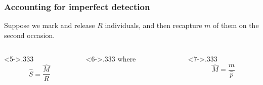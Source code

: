 \documentclass[color=usenames,dvipsnames]{beamer}\usepackage[]{graphicx}\usepackage[]{xcolor}
\begin{document}
\begin{frame}
  \frametitle{Accounting for imperfect detection}
  Suppose we mark and release $R$ individuals, and then
    recapture $m$ of them on the second occasion. \par
    \vfill
    \vfill
    \vspace{-12pt}
    \vfill
  \begin{columns}
    \begin{column}<5->{.333\textheight}
      \[ %
      \hat{S} = \frac{\hat{M}}{R}
      \]
    \end{column}
    \begin{column}<6->{.333\textheight}
      \centering where \par
    \end{column}
    \begin{column}<7->{.333\textheight}
      \[ %
      \hat{M} = \frac{m}{\hat{p}}
      \]
    \end{column}
  \end{columns}
\end{frame}
\end{document}
